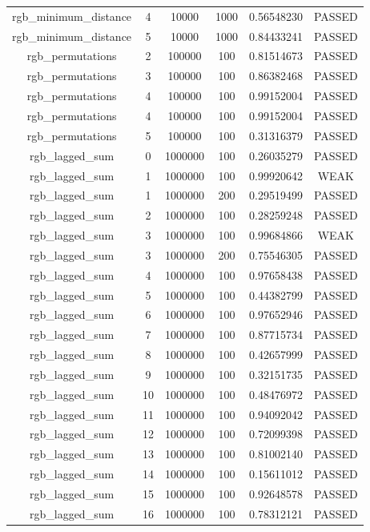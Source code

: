 \begin{longtable}{cccccc}
rgb\_minimum\_distance & 4 & 10000 & 1000 & 0.56548230 & PASSED \\
rgb\_minimum\_distance & 5 & 10000 & 1000 & 0.84433241 & PASSED \\
rgb\_permutations & 2 & 100000 & 100 & 0.81514673 & PASSED \\
rgb\_permutations & 3 & 100000 & 100 & 0.86382468 & PASSED \\
rgb\_permutations & 4 & 100000 & 100 & 0.99152004 & PASSED \\
rgb\_permutations & 4 & 100000 & 100 & 0.99152004 & PASSED \\
rgb\_permutations & 5 & 100000 & 100 & 0.31316379 & PASSED \\
rgb\_lagged\_sum & 0 & 1000000 & 100 & 0.26035279 & PASSED \\
rgb\_lagged\_sum & 1 & 1000000 & 100 & 0.99920642 & WEAK \\
rgb\_lagged\_sum & 1 & 1000000 & 200 & 0.29519499 & PASSED \\
rgb\_lagged\_sum & 2 & 1000000 & 100 & 0.28259248 & PASSED \\
rgb\_lagged\_sum & 3 & 1000000 & 100 & 0.99684866 & WEAK \\
rgb\_lagged\_sum & 3 & 1000000 & 200 & 0.75546305 & PASSED \\
rgb\_lagged\_sum & 4 & 1000000 & 100 & 0.97658438 & PASSED \\
rgb\_lagged\_sum & 5 & 1000000 & 100 & 0.44382799 & PASSED \\
rgb\_lagged\_sum & 6 & 1000000 & 100 & 0.97652946 & PASSED \\
rgb\_lagged\_sum & 7 & 1000000 & 100 & 0.87715734 & PASSED \\
rgb\_lagged\_sum & 8 & 1000000 & 100 & 0.42657999 & PASSED \\
rgb\_lagged\_sum & 9 & 1000000 & 100 & 0.32151735 & PASSED \\
rgb\_lagged\_sum & 10 & 1000000 & 100 & 0.48476972 & PASSED \\
rgb\_lagged\_sum & 11 & 1000000 & 100 & 0.94092042 & PASSED \\
rgb\_lagged\_sum & 12 & 1000000 & 100 & 0.72099398 & PASSED \\
rgb\_lagged\_sum & 13 & 1000000 & 100 & 0.81002140 & PASSED \\
rgb\_lagged\_sum & 14 & 1000000 & 100 & 0.15611012 & PASSED \\
rgb\_lagged\_sum & 15 & 1000000 & 100 & 0.92648578 & PASSED \\
rgb\_lagged\_sum & 16 & 1000000 & 100 & 0.78312121 & PASSED \\

\end{longtable}
